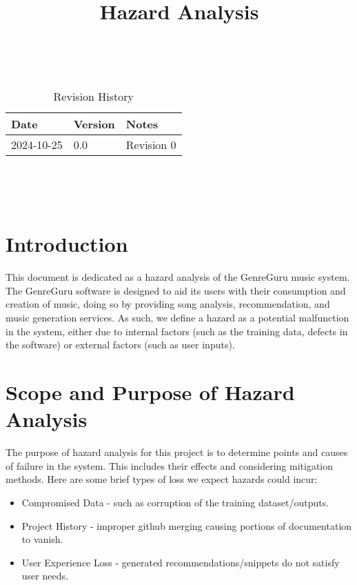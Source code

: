 \documentclass{article}
\title{Hazard Analysis\\\progname}
\author{\authname}
\date{}
\begin{document}
\maketitle
\thispagestyle{empty}

~\newpage


\begin{table}[hp]
\caption{Revision History} \label{TblRevisionHistory}
\begin{tabularx}{\textwidth}{llX}
\toprule
\toprule {\textbf{Date}} & {\textbf{Version}} & {\textbf{Notes}}\\
\midrule
2024-10-25 & 0.0 & Revision 0\\
\bottomrule
\end{tabularx}
\end{table}

~\newpage

\tableofcontents

~\newpage


\section{Introduction}

This document is dedicated as a hazard analysis of the GenreGuru music system. The GenreGuru software is designed to aid its users with their consumption and creation of music, doing so by providing song analysis, recommendation, and music generation services. As such, we define a hazard as a potential malfunction in the system, either due to internal factors (such as the training data, defects in the software) or external factors (such as user inputs).

\section{Scope and Purpose of Hazard Analysis}

The purpose of hazard analysis for this project is to determine points and causes of failure in the system. This includes their effects and considering mitigation methods. Here are some brief types of loss we expect hazards could incur:
\begin{itemize}
    \item Compromised Data - such as corruption of the training dataset/outputs.
    \item Project History - improper github merging causing portions of documentation to vanish.
    \item User Experience Loss - generated recommendations/snippets do not satisfy user needs.
\end{itemize}
\end{document}
